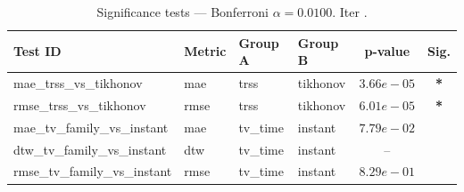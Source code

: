 ﻿%
\begin{table}[ht]
\centering
\caption[EEG reconstruction - Iteration it29]{Significance tests — Bonferroni $\alpha=0.0100$. Iter .}
\label{tab:sig_it29_kalofolias_3syn}
\small
\begin{tabular}{llllcc}
\toprule
Test ID & Metric & Group A & Group B & p-value & Sig. \\
\midrule
mae\_trss\_vs\_tikhonov & mae & trss & tikhonov & $3.66e-05$ & \textbf{*} \\
rmse\_trss\_vs\_tikhonov & rmse & trss & tikhonov & $6.01e-05$ & \textbf{*} \\
mae\_tv\_family\_vs\_instant & mae & tv\_time & instant & $7.79e-02$ &  \\
dtw\_tv\_family\_vs\_instant & dtw & tv\_time & instant & -- &  \\
rmse\_tv\_family\_vs\_instant & rmse & tv\_time & instant & $8.29e-01$ &  \\
\bottomrule
\end{tabular}
\end{table}







